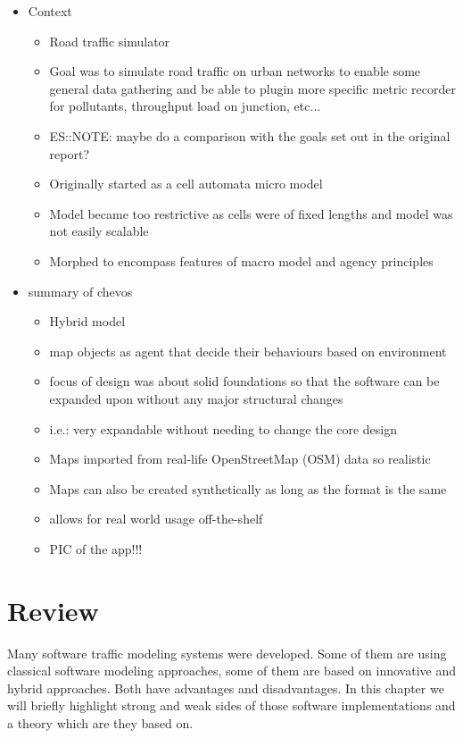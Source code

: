 \begin{itemize}
	\item Context
	\begin{itemize}
		\item Road traffic simulator
		\item Goal was to simulate road traffic on urban networks to enable some general data gathering and be able to plugin more specific metric recorder for pollutants, throughput load on junction, etc...
		\item ES::NOTE: maybe do a comparison with the goals set out in the original report?
		\item Originally started as a cell automata micro model
		\item Model became too restrictive as cells were of fixed lengths and model was not easily scalable
		\item Morphed to encompass features of macro model and agency principles
	\end{itemize}
	\item summary of chevos
	\begin{itemize}
		\item Hybrid model
		\item map objects as agent that decide their behaviours based on environment
		\item focus of design was about solid foundations so that the software can be expanded upon without any major structural changes
		\item i.e.: very expandable without needing to change the core design
		\item Maps imported from real-life OpenStreetMap (OSM) data so realistic
		\item Maps can also be created synthetically as long as the format is the same
		\item allows for real world usage off-the-shelf
		\item PIC of the app!!!
	\end{itemize}
\end{itemize}

\section{Review}

Many software traffic modeling systems were developed.
Some of them are using classical software modeling approaches, some of them are based on innovative and hybrid approaches.
Both have advantages and disadvantages.
In this chapter we will briefly highlight strong and weak sides of those software implementations
and a theory which are they based on.

